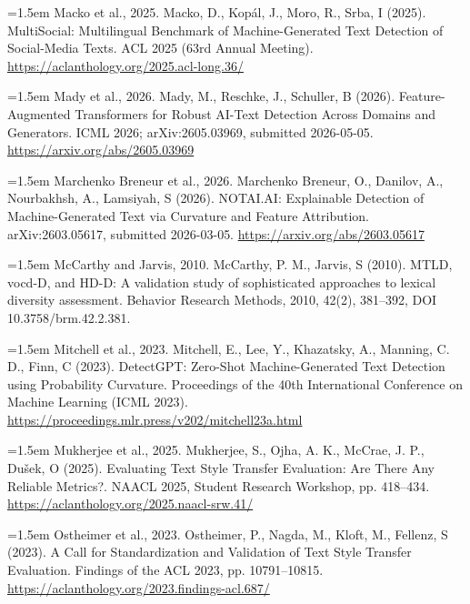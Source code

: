 \documentclass[11pt,a4paper]{article}
\renewcommand{\_}{\textunderscore\allowbreak}
\begin{document}
\noindent\hangindent=1.5em Macko et al., 2025. Macko, D., Kop\'al, J., Moro, R., Srba, I (2025). MultiSocial: Multilingual Benchmark of Machine-Generated Text Detection of Social-Media Texts. ACL 2025 (63rd Annual Meeting). \url{https://aclanthology.org/2025.acl-long.36/}\par\smallskip

\noindent\hangindent=1.5em Mady et al., 2026. Mady, M., Reschke, J., Schuller, B (2026). Feature-Augmented Transformers for Robust AI-Text Detection Across Domains and Generators. ICML 2026; arXiv:2605.03969, submitted 2026-05-05. \url{https://arxiv.org/abs/2605.03969}\par\smallskip

\noindent\hangindent=1.5em Marchenko Breneur et al., 2026. Marchenko Breneur, O., Danilov, A., Nourbakhsh, A., Lamsiyah, S (2026). NOTAI.AI: Explainable Detection of Machine-Generated Text via Curvature and Feature Attribution. arXiv:2603.05617, submitted 2026-03-05. \url{https://arxiv.org/abs/2603.05617}\par\smallskip

\noindent\hangindent=1.5em McCarthy and Jarvis, 2010. McCarthy, P. M., Jarvis, S (2010). MTLD, vocd-D, and HD-D: A validation study of sophisticated approaches to lexical diversity assessment. Behavior Research Methods, 2010, 42(2), 381–392, DOI 10.3758/brm.42.2.381.\par\smallskip

\noindent\hangindent=1.5em Mitchell et al., 2023. Mitchell, E., Lee, Y., Khazatsky, A., Manning, C. D., Finn, C (2023). DetectGPT: Zero-Shot Machine-Generated Text Detection using Probability Curvature. Proceedings of the 40th International Conference on Machine Learning (ICML 2023). \url{https://proceedings.mlr.press/v202/mitchell23a.html}\par\smallskip

\noindent\hangindent=1.5em Mukherjee et al., 2025. Mukherjee, S., Ojha, A. K., McCrae, J. P., Du\v{s}ek, O (2025). Evaluating Text Style Transfer Evaluation: Are There Any Reliable Metrics?. NAACL 2025, Student Research Workshop, pp. 418–434. \url{https://aclanthology.org/2025.naacl-srw.41/}\par\smallskip

\noindent\hangindent=1.5em Ostheimer et al., 2023. Ostheimer, P., Nagda, M., Kloft, M., Fellenz, S (2023). A Call for Standardization and Validation of Text Style Transfer Evaluation. Findings of the ACL 2023, pp. 10791–10815. \url{https://aclanthology.org/2023.findings-acl.687/}\par\smallskip
\end{document}

